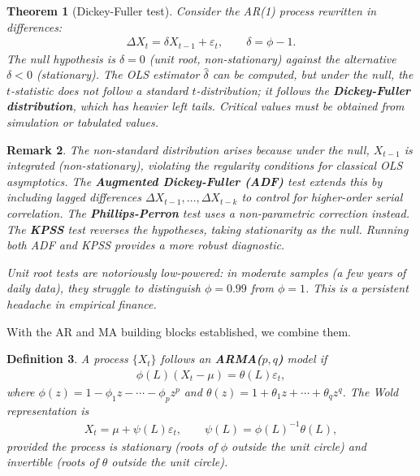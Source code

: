 \documentclass{report}
\theoremstyle{spacedplain}
\newtheorem{theorem}{Theorem}[section]
\theoremstyle{spaceddefinition}
\newtheorem{definition}[theorem]{Definition}
\theoremstyle{spacedremark}
\newtheorem{remark}[theorem]{Remark}
\begin{document}
\begin{theorem}[Dickey-Fuller test]
Consider the AR(1) process rewritten in differences:
\begin{align}
    \Delta X_t = \delta X_{t-1} + \varepsilon_t, \qquad \delta = \phi - 1.
\end{align}
The null hypothesis is $\delta = 0$ (unit root, non-stationary) against the alternative $\delta < 0$ (stationary). The OLS estimator $\hat{\delta}$ can be computed, but under the null, the $t$-statistic does not follow a standard $t$-distribution; it follows the \textbf{Dickey-Fuller distribution}, which has heavier left tails. Critical values must be obtained from simulation or tabulated values.
\end{theorem}

\begin{remark}
The non-standard distribution arises because under the null, $X_{t-1}$ is integrated (non-stationary), violating the regularity conditions for classical OLS asymptotics. The \textbf{Augmented Dickey-Fuller (ADF)} test extends this by including lagged differences $\Delta X_{t-1}, \ldots, \Delta X_{t-k}$ to control for higher-order serial correlation. The \textbf{Phillips-Perron} test uses a non-parametric correction instead. The \textbf{KPSS} test reverses the hypotheses, taking stationarity as the null. Running both ADF and KPSS provides a more robust diagnostic.

Unit root tests are notoriously low-powered: in moderate samples (a few years of daily data), they struggle to distinguish $\phi = 0.99$ from $\phi = 1$. This is a persistent headache in empirical finance.
\end{remark}

With the AR and MA building blocks established, we combine them.

\begin{definition}
A process $\{X_t\}$ follows an \textbf{ARMA($p,q$)} model if
\begin{align}
    \phi(L)(X_t - \mu) = \theta(L)\varepsilon_t,
\end{align}
where $\phi(z) = 1 - \phi_1 z - \cdots - \phi_p z^p$ and $\theta(z) = 1 + \theta_1 z + \cdots + \theta_q z^q$. The Wold representation is
\begin{align}
    X_t = \mu + \psi(L)\varepsilon_t, \qquad \psi(L) = \phi(L)^{-1}\theta(L),
\end{align}
provided the process is stationary (roots of $\phi$ outside the unit circle) and invertible (roots of $\theta$ outside the unit circle).
\end{definition}
\end{document}
